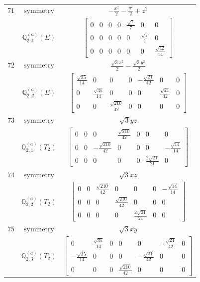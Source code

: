 \documentclass[fleqn,8pt,landscape]{jsarticle}
\begin{document}
\begin{longtable}{ccc}
$ 71 $ & $ \text{symmetry} $ & $ - \frac{x^{2}}{2} - \frac{y^{2}}{2} + z^{2} $ \\
$  $ & $ \mathbb{Q}_{2,1}^{(a)}(E) $ & $ \begin{bmatrix} 0 & 0 & 0 & 0 & \frac{\sqrt{7}}{7} & 0 & 0 \\ 0 & 0 & 0 & 0 & 0 & \frac{\sqrt{7}}{7} & 0 \\ 0 & 0 & 0 & 0 & 0 & 0 & \frac{\sqrt{42}}{14} \end{bmatrix} $ \\ \hline
$ 72 $ & $ \text{symmetry} $ & $ \frac{\sqrt{3} x^{2}}{2} - \frac{\sqrt{3} y^{2}}{2} $ \\
$  $ & $ \mathbb{Q}_{2,2}^{(a)}(E) $ & $ \begin{bmatrix} \frac{\sqrt{35}}{14} & 0 & 0 & 0 & - \frac{\sqrt{21}}{42} & 0 & 0 \\ 0 & \frac{\sqrt{35}}{14} & 0 & 0 & 0 & \frac{\sqrt{21}}{42} & 0 \\ 0 & 0 & \frac{\sqrt{210}}{42} & 0 & 0 & 0 & 0 \end{bmatrix} $ \\ \hline
$ 73 $ & $ \text{symmetry} $ & $ \sqrt{3} y z $ \\
$  $ & $ \mathbb{Q}_{2,1}^{(a)}(T_{2}) $ & $ \begin{bmatrix} 0 & 0 & 0 & \frac{\sqrt{210}}{42} & 0 & 0 & 0 \\ 0 & 0 & - \frac{\sqrt{210}}{42} & 0 & 0 & 0 & - \frac{\sqrt{14}}{14} \\ 0 & 0 & 0 & 0 & 0 & \frac{2 \sqrt{21}}{21} & 0 \end{bmatrix} $ \\ \hline
$ 74 $ & $ \text{symmetry} $ & $ \sqrt{3} x z $ \\
$  $ & $ \mathbb{Q}_{2,2}^{(a)}(T_{2}) $ & $ \begin{bmatrix} 0 & 0 & \frac{\sqrt{210}}{42} & 0 & 0 & 0 & - \frac{\sqrt{14}}{14} \\ 0 & 0 & 0 & \frac{\sqrt{210}}{42} & 0 & 0 & 0 \\ 0 & 0 & 0 & 0 & \frac{2 \sqrt{21}}{21} & 0 & 0 \end{bmatrix} $ \\ \hline
$ 75 $ & $ \text{symmetry} $ & $ \sqrt{3} x y $ \\
$  $ & $ \mathbb{Q}_{2,3}^{(a)}(T_{2}) $ & $ \begin{bmatrix} 0 & \frac{\sqrt{35}}{14} & 0 & 0 & 0 & - \frac{\sqrt{21}}{42} & 0 \\ - \frac{\sqrt{35}}{14} & 0 & 0 & 0 & - \frac{\sqrt{21}}{42} & 0 & 0 \\ 0 & 0 & 0 & \frac{\sqrt{210}}{42} & 0 & 0 & 0 \end{bmatrix} $ \\ \hline

\end{longtable}
\end{document}
